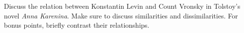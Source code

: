 \needspace{2cm}
\question[5] Discuss the relation between Konstantin Levin and Count Vronsky in Tolstoy's novel \textit{Anna Karenina}.
Make sure to discuss similarities and dissimilarities.
For bonus points, briefly contrast their relationships.
\vspace{6cm}
